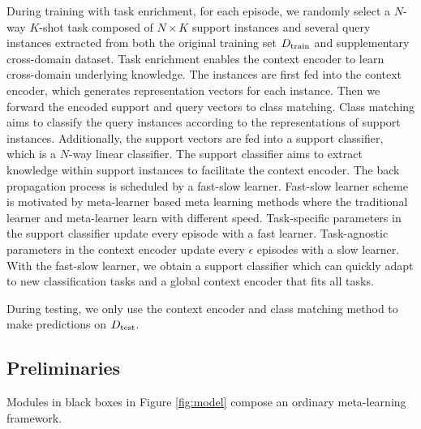 During training with task enrichment, for each episode, we randomly select a 
$N$-way $K$-shot task composed of $N \times K$ support instances and several query instances extracted from both the original training set $D_{\rm{train}}$ and supplementary cross-domain dataset.
Task enrichment enables the context encoder to learn cross-domain underlying knowledge.
The instances are first fed into the context encoder, which generates representation vectors for each instance.
Then we forward the encoded support and query vectors to class matching. Class matching aims to classify the query instances according to the representations of support instances.
Additionally, the support vectors are fed into a support classifier, which is a $N$-way linear classifier.
The support classifier aims to extract knowledge within support instances to facilitate the context encoder.
The back propagation process is scheduled by a fast-slow learner. Fast-slow learner scheme is motivated by meta-learner based meta learning methods \cite{Andry2016,Finn2017,HN} where the traditional learner and meta-learner learn with different speed. Task-specific parameters in the support classifier update every episode with a fast learner. Task-agnostic parameters in the context encoder update every $\epsilon$ episodes with a slow learner.
With the fast-slow learner, we obtain a support classifier which can quickly adapt to new classification tasks and a global context encoder that fits all tasks.

During testing, we only use the context encoder and class matching method to make predictions on $D_{\rm{test}}$.

\subsection{Preliminaries}
Modules in black boxes in Figure \ref{fig:model} compose an ordinary meta-learning framework.

